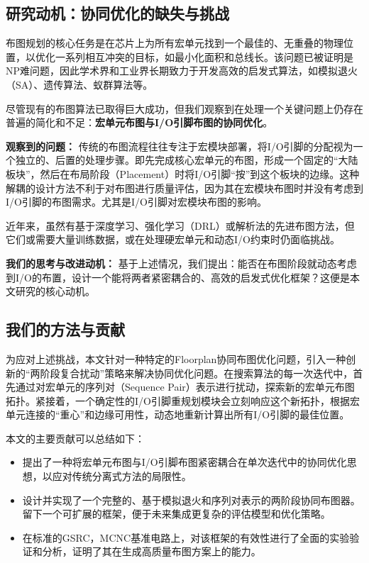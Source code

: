 \documentclass[conference]{IEEEtran}
\begin{document}
\subsection{研究动机：协同优化的缺失与挑战}
布图规划的核心任务是在芯片上为所有宏单元找到一个最佳的、无重叠的物理位置，以优化一系列相互冲突的目标，如最小化面积和总线长。该问题已被证明是NP难问题，因此学术界和工业界长期致力于开发高效的启发式算法，如模拟退火（SA）\cite{J.W.-41}、遗传算法\cite{5658785}、蚁群算法\cite{B.R.-95}等。

尽管现有的布图算法已取得巨大成功，但我们观察到在处理一个关键问题上仍存在普遍的简化和不足：\textbf{宏单元布图与I/O引脚布图的协同优化}。

\textbf{观察到的问题：} 传统的布图流程往往专注于宏模块部署，将I/O引脚的分配视为一个独立的、后置的处理步骤。即先完成核心宏单元的布图，形成一个固定的“大陆板块”，然后在布局阶段（Placement）时将I/O引脚“按”到这个板块的边缘。这种解耦的设计方法不利于对布图进行质量评估，因为其在宏模块布图时并没有考虑到I/O引脚的布图需求。尤其是I/O引脚对宏模块布图的影响。

近年来，虽然有基于深度学习\cite{A.A.-44}、强化学习（DRL）\cite{W.X.-96}或解析法\cite{J.C.-43}的先进布图方法，但它们或需要大量训练数据，或在处理硬宏单元和动态I/O约束时仍面临挑战。

\textbf{我们的思考与改进动机：} 基于上述情况，我们提出：能否在布图阶段就动态考虑到I/O的布置，设计一个能将两者紧密耦合的、高效的启发式优化框架？这便是本文研究的核心动机。

\subsection{我们的方法与贡献}
为应对上述挑战，本文针对一种特定的Floorplan协同布图优化问题，引入一种创新的“两阶段复合扰动”策略来解决协同优化问题。在搜索算法的每一次迭代中，首先通过对宏单元的序列对（Sequence Pair）表示进行扰动，探索新的宏单元布图拓扑。紧接着，一个确定性的I/O引脚重规划模块会立刻响应这个新拓扑，根据宏单元连接的“重心”和边缘可用性，动态地重新计算出所有I/O引脚的最佳位置。

本文的主要贡献可以总结如下：
\begin{itemize}
    \item 提出了一种将宏单元布图与I/O引脚布图紧密耦合在单次迭代中的协同优化思想，以应对传统分离式方法的局限性。
    \item 设计并实现了一个完整的、基于模拟退火和序列对表示的两阶段协同布图器。留下一个可扩展的框架，便于未来集成更复杂的评估模型和优化策略。
    \item 在标准的GSRC，MCNC\cite{Kozminski-45}基准电路上，对该框架的有效性进行了全面的实验验证和分析，证明了其在生成高质量布图方案上的能力。
\end{itemize}
\end{document}
